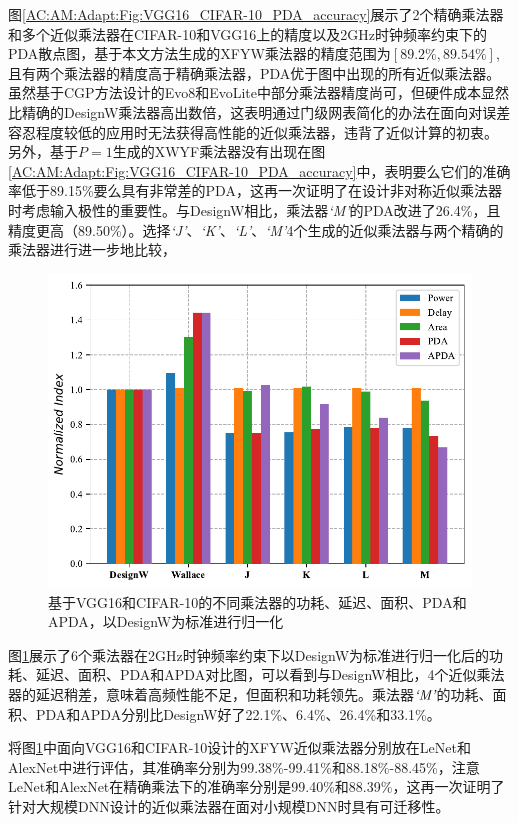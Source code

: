 图\ref{AC:AM:Adapt:Fig:VGG16_CIFAR-10_PDA_accuracy}展示了2个精确乘法器和多个近似乘法器在CIFAR-10\cite{DNN:CIFAR-10}和VGG16\cite{DNN:AlexNet}上的精度以及2GHz时钟频率约束下的PDA散点图，基于本文方法生成的XFYW乘法器的精度范围为$[89.2\%, 89.54\%]$,且有两个乘法器的精度高于精确乘法器，PDA优于图中出现的所有近似乘法器。
虽然基于CGP方法设计的Evo8\cite{AC:AM:CGP_Evoapprox8b}和EvoLite\cite{AC:AM:CGP_EvoLite}中部分乘法器精度尚可，但硬件成本显然比精确的DesignW乘法器高出数倍，这表明通过门级网表简化的办法在面向对误差容忍程度较低的应用时无法获得高性能的近似乘法器，违背了近似计算的初衷。
另外，基于$P=1$生成的XWYF乘法器没有出现在图\ref{AC:AM:Adapt:Fig:VGG16_CIFAR-10_PDA_accuracy}中，表明要么它们的准确率低于89.15\%要么具有非常差的PDA，这再一次证明了在设计非对称近似乘法器时考虑输入极性的重要性。与DesignW相比，乘法器\emph{`M'}的PDA改进了26.4\%，且精度更高（89.50\%）。选择\emph{`J'}、\emph{`K'}、\emph{`L'}、\emph{`M'}4个生成的近似乘法器与两个精确的乘法器进行进一步地比较，
\begin{figure}[!htb]
    \centering
    \includegraphics[width=0.7\linewidth]{figs/AC-AM-Adapt-VGG16_CIFAR-10_hist.pdf}
    \caption{基于VGG16和CIFAR-10的不同乘法器的功耗、延迟、面积、PDA和APDA，以DesignW为标准进行归一化}
    \label{AC:AM:Adapt:Fig:VGG16_CIFAR-10_hist}
\end{figure}
图\ref{AC:AM:Adapt:Fig:VGG16_CIFAR-10_hist}展示了6个乘法器在2GHz时钟频率约束下以DesignW为标准进行归一化后的功耗、延迟、面积、PDA和APDA对比图，可以看到与DesignW相比，4个近似乘法器的延迟稍差，意味着高频性能不足，但面积和功耗领先。乘法器$\emph{`M'}$的功耗、面积、PDA和APDA分别比DesignW好了22.1\%、6.4\%、26.4\%和33.1\%。

将图\ref{AC:AM:Adapt:Fig:VGG16_CIFAR-10_hist}中面向VGG16和CIFAR-10设计的XFYW近似乘法器分别放在LeNet和AlexNet中进行评估，其准确率分别为99.38\%-99.41\%和88.18\%-88.45\%，注意LeNet和AlexNet在精确乘法下的准确率分别是99.40\%和88.39\%，这再一次证明了针对大规模DNN设计的近似乘法器在面对小规模DNN时具有可迁移性。


